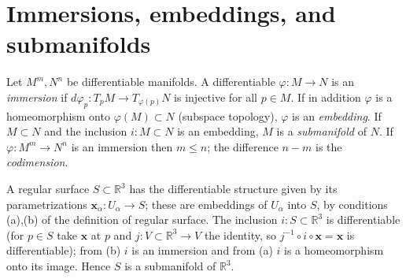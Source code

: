 \section{Immersions, embeddings, and submanifolds}

\begin{definition}
  \label{def:dc-ch0-3-1}


  Let $M^m,N^n$ be differentiable manifolds. A differentiable $\varphi:M\to N$ is an
  \emph{immersion} if $d\varphi_p:T_pM\to T_{\varphi(p)}N$ is injective for all $p\in M$.
  If in addition $\varphi$ is a homeomorphism onto $\varphi(M)\subset N$ (subspace
  topology), $\varphi$ is an \emph{embedding}. If $M\subset N$ and the inclusion
  $i:M\subset N$ is an embedding, $M$ is a \emph{submanifold} of $N$. If $\varphi:M^m\to
  N^n$ is an immersion then $m\le n$; the difference $n-m$ is the \emph{codimension}.
\end{definition}

\begin{example}
  \label{ex:dc-ch0-3-6}


  A regular surface $S\subset\mathbb{R}^3$ has the differentiable structure given by
  its parametrizations $\mathbf{x}_\alpha:U_\alpha\to S$; these are embeddings of
  $U_\alpha$ into $S$, by conditions (a),(b) of the definition of regular surface.
  The inclusion $i:S\subset\mathbb{R}^3$ is differentiable (for $p\in S$ take
  $\mathbf{x}$ at $p$ and $j:V\subset\mathbb{R}^3\to V$ the identity, so
  $j^{-1}\circ i\circ\mathbf{x}=\mathbf{x}$ is differentiable); from (b) $i$ is an
  immersion and from (a) $i$ is a homeomorphism onto its image. Hence $S$ is a
  submanifold of $\mathbb{R}^3$.
\end{example}

